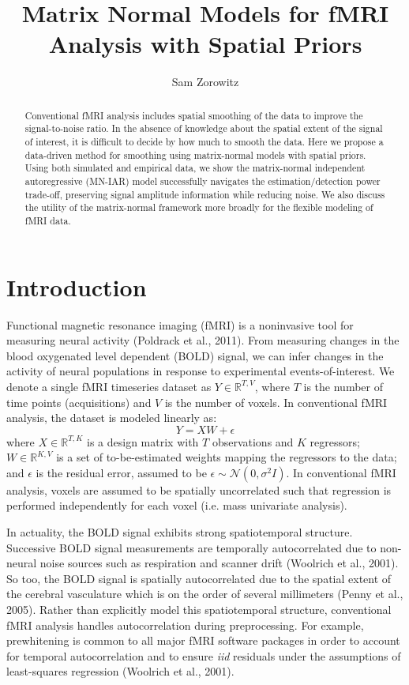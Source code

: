 \documentclass[9pt]{NEU560-final}
\title{Matrix Normal Models for fMRI Analysis with Spatial Priors}
\author[1]{Sam Zorowitz}
\begin{document}
\maketitle

\begin{abstract}
Conventional fMRI analysis includes spatial smoothing of the data to improve the signal-to-noise ratio. In the absence of knowledge about the spatial extent of the signal of interest, it is difficult to decide by how much to smooth the data. Here we propose a data-driven method for smoothing using matrix-normal models with spatial priors. Using both simulated and empirical data, we show the matrix-normal independent autoregressive (MN-IAR) model successfully navigates the estimation/detection power trade-off, preserving signal amplitude information while reducing noise. We also discuss the utility of the matrix-normal framework more broadly for the flexible modeling of fMRI data.
\end{abstract}

\section{Introduction}
Functional magnetic resonance imaging (fMRI) is a noninvasive tool for measuring neural activity (Poldrack et al., 2011). From measuring changes in the blood oxygenated level dependent (BOLD) signal, we can infer changes in the activity of neural populations in response to experimental events-of-interest. We denote a single fMRI timeseries dataset as $Y \in \mathbb{R}^{T,V}$, where $T$ is the number of time points (acquisitions) and $V$ is the number of voxels. In conventional fMRI analysis, the dataset is modeled linearly as:
$$ Y = XW + \epsilon $$ 
where $X \in \mathbb{R}^{T,K}$ is a design matrix with $T$ observations and $K$ regressors; $W \in \mathbb{R}^{K,V}$ is a set of to-be-estimated weights mapping the regressors to the data; and $\epsilon$ is the residual error, assumed to be $\epsilon \sim \mathcal{N}(0, \sigma^2 I)$. In conventional fMRI analysis, voxels are assumed to be spatially uncorrelated such that regression is performed independently for each voxel (i.e. mass univariate analysis). 

In actuality, the BOLD signal exhibits strong spatiotemporal structure. Successive BOLD signal measurements are temporally autocorrelated due to non-neural noise sources such as respiration and scanner drift (Woolrich et al., 2001). So too, the BOLD signal is spatially autocorrelated due to the spatial extent of the cerebral vasculature which is on the order of several millimeters (Penny et al., 2005). Rather than explicitly model this spatiotemporal structure, conventional fMRI analysis handles autocorrelation during preprocessing. For example, prewhitening is common to all major fMRI software packages in order to account for temporal autocorrelation and to ensure \textit{iid} residuals under the assumptions of least-squares regression (Woolrich et al., 2001). 
\end{document}
